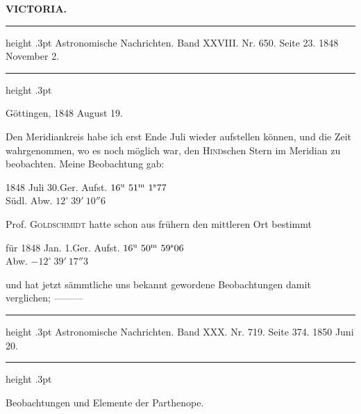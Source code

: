 \clearpage
\thispagestyle{empty}
\noindent{}%
%
\parbox[t]{\dimexpr\linewidth-24mm\relax}{\centering\footnotesize\bfseries VICTORIA.\par}%
\makebox[12mm][r]{}\par\nobreak\medskip
\begin{center}
\parbox{.85\linewidth}{%
\centering\small
\hrule height .3pt\relax\vspace{2.5pt}
Astronomische Nachrichten. Band XXVIII. Nr. 650. Seite 23. 1848 November 2.\par
\vspace{2.5pt}\hrule height .3pt\relax
}
\end{center}
\begin{flushright}Göttingen, 1848 August 19.\end{flushright}

Den Meridiankreis habe ich erst Ende Juli wieder aufstellen können, und die Zeit wahrgenommen, wo es noch möglich war, den \textsc{Hind}schen Stern im Meridian zu beobachten. Meine Beobachtung gab:

\begin{center}
1848 Juli 30.\quad Ger. Aufst. $16^{\rm u}\ 51^{\rm m}\ 1^{\rm s}77$\\
Südl. Abw. $12^\circ\ 39'\ 10''6$
\end{center}

Prof. \textsc{Goldschmidt} hatte schon aus frühern den mittleren Ort bestimmt

\begin{center}
für 1848 Jan. 1.\quad Ger. Aufst. $16^{\rm u}\ 50^{\rm m}\ 59^{\rm s}06$\\
Abw. $-12^\circ\ 39'\ 17''3$
\end{center}

und hat jetzt sämmtliche uns bekannt gewordene Beobachtungen damit verglichen; \mbox{---\quad---\quad---}

\par\bigskip
{}
\hypertarget{native-483-parthenope}{}
\begin{center}
\parbox{.79\linewidth}{%
\centering\small
\hrule height .3pt\relax\vspace{2.5pt}
Astronomische Nachrichten. Band XXX. Nr. 719. Seite 374. 1850 Juni 20.\par
\vspace{2.5pt}\hrule height .3pt\relax
}
\end{center}
\begin{center}Beobachtungen und Elemente der Parthenope.\end{center}

